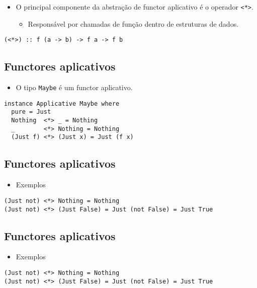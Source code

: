 \documentclass[11pt]{article}
\begin{document}
\begin{itemize}
\item O principal componente da abstração de functor aplicativo é o operador \texttt{<*>}.
\begin{itemize}
\item Responsável por chamadas de função dentro de estruturas de dados.
\end{itemize}
\end{itemize}

\begin{verbatim}
(<*>) :: f (a -> b) -> f a -> f b
\end{verbatim}
\subsection*{Functores aplicativos}
\label{sec:org3131a0c}

\begin{itemize}
\item O tipo \texttt{Maybe} é um functor aplicativo.
\end{itemize}

\begin{verbatim}
instance Applicative Maybe where  
  pure = Just  
  Nothing  <*> _ = Nothing
  _        <*> Nothing = Nothing
  (Just f) <*> (Just x) = Just (f x)
\end{verbatim}
\subsection*{Functores aplicativos}
\label{sec:orgb211a70}

\begin{itemize}
\item Exemplos
\end{itemize}

\begin{verbatim}
(Just not) <*> Nothing = Nothing
(Just not) <*> (Just False) = Just (not False) = Just True
\end{verbatim}
\subsection*{Functores aplicativos}
\label{sec:org1fde6a0}

\begin{itemize}
\item Exemplos
\end{itemize}

\begin{verbatim}
(Just not) <*> Nothing = Nothing
(Just not) <*> (Just False) = Just (not False) = Just True
\end{verbatim}
\end{document}

